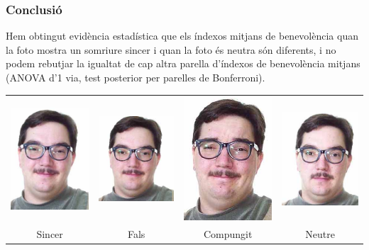\documentclass[12pt,t]{beamer}
\theoremstyle{plain}
\theoremstyle{definition}
\begin{document}
\begin{frame}
\frametitle{Conclusió} 

Hem obtingut evidència estadística que els índexos mitjans de benevolència quan  la foto mostra un somriure sincer i quan la foto és neutra són diferents, i no podem rebutjar la igualtat de cap altra parella d'índexos de benevolència mitjans (ANOVA d'1 via, test posterior per parelles de Bonferroni). 
\medskip

\begin{center}
\begin{tabular}{cccc}
\includegraphics[width=0.19\linewidth]{felt} & 
\includegraphics[width=0.21\linewidth]{false} & 
\includegraphics[width=0.173\linewidth]{miserable} & 
\includegraphics[width=0.2\linewidth]{neutral}\\
Sincer & Fals & Compungit & Neutre
\end{tabular}
\end{center}
\end{frame}
\end{document}
